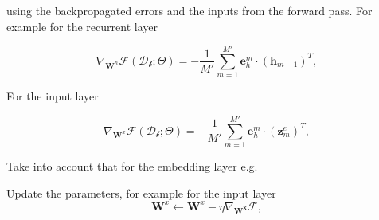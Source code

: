 \begin{algorithm}
\begin{algorithmic}[1]
	\ENDFOR	

	\vspace{0.3cm}
     using the backpropagated errors and the inputs from the forward pass. For example for the recurrent layer

        $$\nabla_{\mathbf{W}^h}\mathcal{F}(\mathcal{D_b};\Theta)  = -\frac{1}{M'} \sum_{m=1}^{M'} \mathbf{e}^m_h \cdot \left(\mathbf{h}_{m-1}\right)^T,$$

    For the input layer

        $$\nabla_{\mathbf{W}^x}\mathcal{F}(\mathcal{D_b};\Theta)  = -\frac{1}{M'} \sum_{m=1}^{M'} \mathbf{e}^m_h \cdot \left(\mathbf{z}^e_{m}\right)^T,$$

    Take into account that for the embedding layer e.g.

	\vspace{0.3cm}
    \STATE Update the parameters, for example for the input layer
        $$\mathbf{W}^x \leftarrow \mathbf{W}^x - \eta \nabla_\mathbf{W^x}\mathcal{F},$$
	\ENDFOR
	\ENDFOR
\end{algorithmic}
\end{algorithm}


